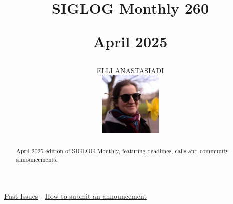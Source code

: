 \documentclass[prodmode,acmtecs]{acmsmall} %
\newcounter{colstart}
\begin{document}
\setcounter{colstart}{\thepage}

\title{{\huge\sc SIGLOG Monthly 260}

 April 2025}\author{ELLI ANASTASIADI\vspace*{-2.6cm}\begin{flushright}\includegraphics[width=30mm]{elli_anastasiadi.png}\end{flushright}}\begin{abstract}April 2025 edition of SIGLOG Monthly, featuring deadlines, calls and community announcements.
\end{abstract}


\maketitlee

\href{https://lics.siglog.org/newsletters/}{Past Issues}
 - 
\href{https://lics.siglog.org/newsletters/inst.html}{How to submit an announcement}
\end{document}
